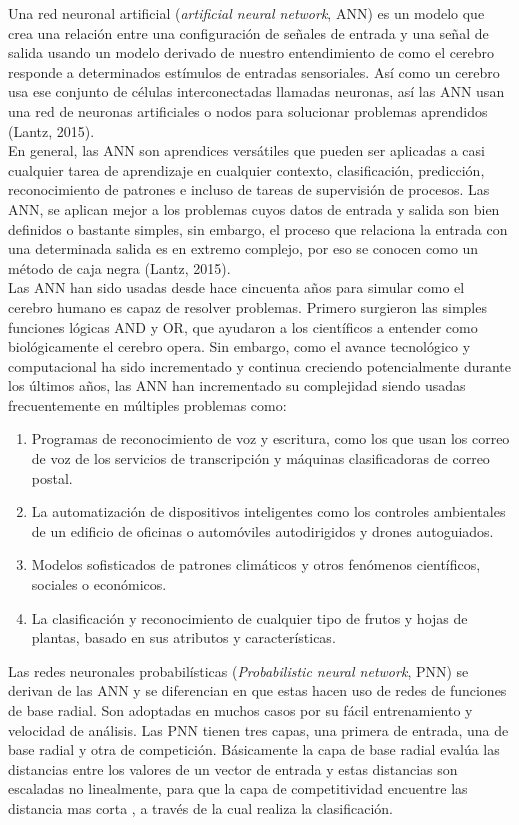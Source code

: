 Una red neuronal artificial (\textit{artificial neural network}, ANN) es un modelo que crea una relación entre una configuración de señales de entrada y una señal de salida usando un modelo derivado de nuestro entendimiento de como el cerebro responde a determinados estímulos de entradas sensoriales. Así como un cerebro usa ese conjunto de células interconectadas llamadas neuronas, así las ANN usan una red de neuronas artificiales o nodos para solucionar problemas aprendidos (Lantz, 2015).\\

En general, las ANN son aprendices versátiles que pueden ser aplicadas a casi cualquier tarea de aprendizaje en cualquier contexto, clasificación, predicción, reconocimiento de patrones e incluso  de tareas de supervisión de procesos. Las ANN, se aplican mejor a los problemas cuyos datos de entrada y salida son bien definidos o bastante simples, sin embargo, el proceso que relaciona la entrada con una determinada salida es en extremo complejo, por eso se conocen como un método de caja negra (Lantz, 2015).\\

Las ANN han sido usadas desde hace cincuenta años para simular como el cerebro humano es capaz de resolver problemas. Primero surgieron las simples funciones lógicas AND y OR, que ayudaron a los científicos a entender como biológicamente el cerebro opera. Sin embargo, como el avance tecnológico y computacional ha sido incrementado y continua creciendo potencialmente durante los últimos años, las ANN han incrementado su complejidad siendo usadas frecuentemente en múltiples problemas como:

\begin{enumerate}
    \item{Programas de reconocimiento de voz y escritura, como los que usan los correo de voz
de los servicios de transcripción y máquinas clasificadoras de correo postal.}
	\item{La automatización de dispositivos inteligentes como los controles ambientales de un edificio de oficinas o automóviles autodirigidos y drones autoguiados.}
	\item{Modelos sofisticados de patrones climáticos y otros fenómenos científicos, sociales o económicos.}
	\item{La clasificaci\'on y reconocimiento de cualquier tipo de frutos y hojas de plantas, basado en sus atributos y características.}
\end{enumerate} 

Las redes neuronales probabilísticas  (\textit{Probabilistic neural network}, PNN) se derivan de las ANN y se diferencian en que estas hacen uso de redes de funciones de base radial. Son adoptadas en muchos casos por su fácil entrenamiento y velocidad de análisis. Las PNN tienen tres capas, una primera de entrada, una de base radial y otra de competición. Básicamente la capa de base radial evalúa las distancias entre los valores de un vector de entrada y estas distancias son escaladas no linealmente, para que la capa de competitividad encuentre las distancia mas corta , a través de la cual realiza la clasificación.\\

